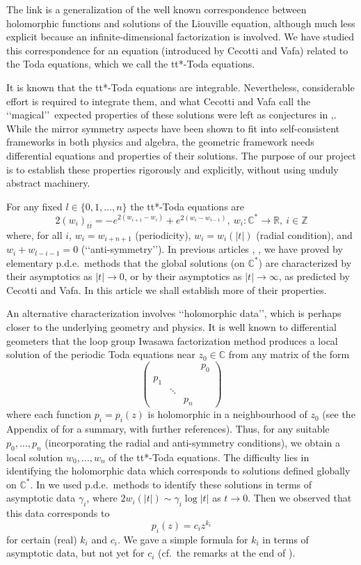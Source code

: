 \documentclass[a4paper,12pt,leqno]{amsart}
\numberwithin{equation}{section}
\theoremstyle{plain}
\theoremstyle{definition}
\newcommand{\C}{\mathbb C}
\newcommand{\R}{\mathbb R}
\newcommand{\Z}{\mathbb Z}
\newcommand{\ga}{\gamma}
\renewcommand{\ll}{\lq\lq}
\newcommand{\rr}{\rq\rq\ }
\newcommand{\rrr}{\rq\rq}
\newcommand{\bp}{\begin{pmatrix}}
\newcommand{\ep}{\end{pmatrix}}
\newcommand{\ttb}{ {t\bar t}  }
\begin{document}
The link is a generalization of the well known correspondence between holomorphic functions and solutions of the Liouville equation, although much less explicit because an infinite-dimensional factorization is involved.
We have studied this correspondence for an equation (introduced by Cecotti and Vafa) related to the Toda equations, which we call the tt*-Toda equations.  

It is known that the tt*-Toda equations are integrable.  Nevertheless, considerable effort is required to integrate them, and what  Cecotti and Vafa call the \ll magical\rr expected properties of these solutions were left as conjectures in \cite{CeVa91},\cite{CeVa92a}.  While the mirror symmetry aspects have been shown to fit into self-consistent frameworks in both physics and algebra, the geometric framework needs differential equations and properties of their solutions. The purpose of our project is to establish these properties rigorously and explicitly, without using unduly abstract machinery. 

For any fixed $l\in\{0,1,\dots,n\}$
the  tt*-Toda equations are
\begin{equation}\label{ost}
 2(w_i)_{\ttb}=-e^{2(w_{i+1}-w_{i})} + e^{2(w_{i}-w_{i-1})}, \ 
 w_i:\C^\ast\to\R, \ 
 i\in\Z
\end{equation}
where, for all $i$,  
$w_i=w_{i+n+1}$ (periodicity),  
$w_i=w_i(\vert t\vert)$
(radial condition), and $w_i+w_{l-i-1}=0$
(\ll anti-symmetry\rrr).  
In previous articles \cite{GuItLiXX}, \cite{GuItLi15},
we have proved by elementary p.d.e.\ methods that the global solutions (on $\C^\ast$) are characterized by their asymptotics as $\vert t\vert\to 0$, or by their asymptotics as $\vert t\vert\to \infty$, as predicted by 
Cecotti and Vafa.  In this article we shall establish more of their properties.

An alternative characterization involves \ll holomorphic data\rrr, which is perhaps closer to the underlying geometry and physics.
It is well known to differential geometers that the loop group  Iwasawa factorization method produces a local solution of the periodic Toda equations near
$z_0\in\C$ from any matrix of the form
\[
\bp
 & & & p_0\\
 p_1 & & & \\
  & \ddots & & \\
   & & p_n &
\ep
\]
where each function $p_i=p_i(z)$ is holomorphic in a neighbourhood of $z_0$ (see the Appendix of \cite{GuLi14} for a summary, with further references). 
Thus, for any suitable $p_0,\dots,p_n$ (incorporating the radial and anti-symmetry conditions),  we obtain a local solution  $w_0,\dots,w_n$ of the tt*-Toda equations.  The  difficulty lies in identifying the holomorphic data which corresponds to solutions defined globally on $\C^\ast$.  In \cite{GuLi14} we used p.d.e.\ methods to identify these solutions in terms of asymptotic data $\ga_i$, where $2w_i(\vert t\vert)\sim\ga_i\log\vert t\vert$ as $t\to 0$. Then
we observed that this data corresponds to 
\[
p_i(z)=c_iz^{k_i}
\]
for certain (real) $k_i$ and $c_i$.  We gave a simple formula for $k_i$ in terms of asymptotic data, but not yet for $c_i$ (cf.\ the remarks at the end of \cite{GuLi14}).  
\end{document}

